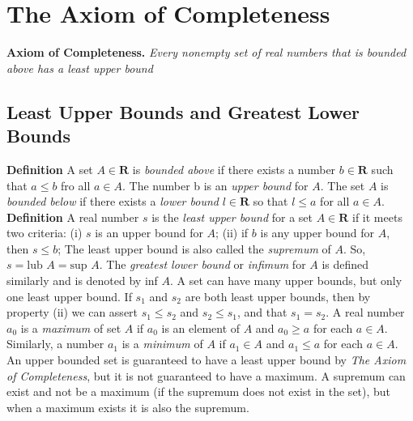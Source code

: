 \section{The Axiom of Completeness}
    \textbf{Axiom of Completeness.} \textit{Every nonempty set of real numbers that is bounded above has a least upper bound}
    \subsection*{Least Upper Bounds and Greatest Lower Bounds}
        \textbf{Definition} A set $A \in \textbf{R}$ is \textit{bounded above} if there exists a number $b \in \textbf{R}$ such that $a \leq b$ fro all $a \in A$. The number b is an \textit{upper bound} for $A$. 
        \newline \indent The set $A$ is \textit{bounded below} if there exists a \textit{lower bound} $l \in \textbf{R}$ so that $l \leq a$ for all $a \in A$.
        \newline \textbf{Definition} A real number $s$ is the \textit{least upper bound} for a set $A \in \textbf{R}$ if it meets two criteria:
        \newline \indent (i) $s$ is an upper bound for $A$;
        \newline \indent (ii) if $b$ is any upper bound for $A$, then $s \leq b$;
        \newline
        The least upper bound is also called the \textit{supremum} of $A$. So, $s = \text{lub } A = \text{sup } A$. 
        \newline \indent The \textit{greatest lower bound} or \textit{infimum} for $A$ is defined similarly and is denoted by inf $A$.
        \newline \indent A set can have many upper bounds, but only one least upper bound. If $s_1$ and $s_2$ are both least upper bounds, then by property (ii) we can assert $s_1 \leq s_2$ and $s_2 \leq s_1$, and that $s_1 = s_2$.
        \newline \indent A real number $a_0$ is a \textit{maximum} of set $A$ if $a_0$ is an element of $A$ and $a_0 \geq a$ for each $a \in A$. Similarly, a number $a_1$ is a \textit{minimum} of $A$ if $a_1 \in A$ and $a_1 \leq a$ for each $a \in A$.
        \newline \indent An upper bounded set is guaranteed to have a least upper bound by \textit{The Axiom of Completeness}, but it is not guaranteed to have a maximum. A supremum can exist and not be a maximum (if the supremum does not exist in the set), but when a maximum exists it is also the supremum.

